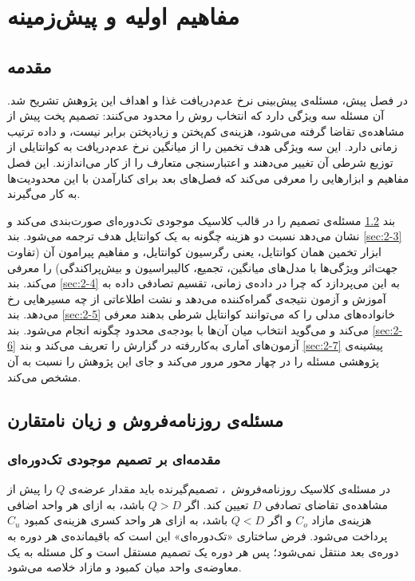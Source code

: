 \chapter{مفاهیم اولیه و پیش‌زمینه}

\section{مقدمه}
\label{sec:2-1}

در فصل پیش، مسئله‌ی پیش‌بینی نرخ عدم‌دریافت غذا و اهداف این پژوهش تشریح شد. آن مسئله سه
ویژگی دارد که انتخاب روش را محدود می‌کنند: تصمیم پخت پیش از مشاهده‌ی تقاضا گرفته
می‌شود، هزینه‌ی کم‌پختن و زیادپختن برابر نیست، و داده ترتیب زمانی دارد. این سه ویژگی
هدف تخمین را از میانگین نرخ عدم‌دریافت به کوانتایلی از توزیع شرطی آن تغییر می‌دهند و
اعتبارسنجی متعارف را از کار می‌اندازند. این فصل مفاهیم و ابزارهایی را معرفی می‌کند که
فصل‌های بعد برای کنارآمدن با این محدودیت‌ها به کار می‌گیرند.

بند \ref{sec:2-2} مسئله‌ی تصمیم را در قالب کلاسیک موجودی تک‌دوره‌ای صورت‌بندی می‌کند و
نشان می‌دهد نسبت دو هزینه چگونه به یک کوانتایل هدف ترجمه می‌شود. بند \ref{sec:2-3}
ابزار تخمین همان کوانتایل، یعنی رگرسیون کوانتایل، و مفاهیم پیرامون آن (تفاوت جهت‌اثر
ویژگی‌ها با مدل‌های میانگین، تجمیع، کالیبراسیون و بیش‌پراکندگی) را معرفی می‌کند. بند
\ref{sec:2-4} به این می‌پردازد که چرا در داده‌ی زمانی، تقسیم تصادفی داده به آموزش و
آزمون نتیجه‌ی گمراه‌کننده می‌دهد و نشت اطلاعاتی از چه مسیرهایی رخ می‌دهد. بند
\ref{sec:2-5} خانواده‌های مدلی را که می‌توانند کوانتایل شرطی بدهند معرفی می‌کند و
می‌گوید انتخاب میان آن‌ها با بودجه‌ی محدود چگونه انجام می‌شود. بند \ref{sec:2-6}
آزمون‌های آماری به‌کاررفته در گزارش را تعریف می‌کند و بند \ref{sec:2-7} پیشینه‌ی
پژوهشی مسئله را در چهار محور مرور می‌کند و جای این پژوهش را نسبت به آن مشخص می‌کند.

\section{مسئله‌ی روزنامه‌فروش و زیان نامتقارن}
\label{sec:2-2}

\subsection{مقدمه‌ای بر تصمیم موجودی تک‌دوره‌ای}
\label{sec:2-2-1}

در مسئله‌ی کلاسیک روزنامه‌فروش~\cite{Arrow51inventory}،
تصمیم‌گیرنده باید مقدار عرضه‌ی $Q$ را پیش از مشاهده‌ی تقاضای تصادفی $D$ تعیین کند. اگر
$Q > D$ باشد، به ازای هر واحد اضافی هزینه‌ی مازاد $C_o$ و اگر $Q < D$ باشد، به ازای هر
واحد کسری هزینه‌ی کمبود $C_u$ پرداخت می‌شود. فرض ساختاری
«تک‌دوره‌ای» این است که باقیمانده‌ی هر دوره به
دوره‌ی بعد منتقل نمی‌شود؛ پس هر دوره یک تصمیم مستقل است و کل مسئله به یک معاوضه‌ی واحد
میان کمبود و مازاد خلاصه می‌شود.

